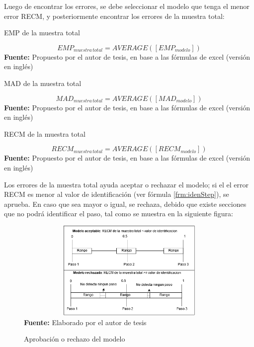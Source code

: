 Luego de encontrar los errores, se debe seleccionar el modelo que tenga el menor error \acrshort{RECM}, y posteriormente encontrar los errores de la muestra total:
 \begin{formula}[H]
	\centering
	\caption{EMP de la muestra total}
	\label{frm:EmpAll}
	\begin{equation}
EMP_{muestra\, total}=AVERAGE([EMP_{modelo}])
	\end{equation}
	\textbf{Fuente:} Propuesto por el autor de tesis, en base a las f\'ormulas de excel (versi\'on en ingl\'es)
\end{formula}  
 \begin{formula}[H]
	\centering
	\caption{MAD de la muestra total}
	\label{frm:MadAll}
	\begin{equation}
MAD_{muestra\, total}=AVERAGE([MAD_{modelo}])
	\end{equation}
	\textbf{Fuente:} Propuesto por el autor de tesis, en base a las f\'ormulas de excel (versi\'on en ingl\'es)
\end{formula}  
	 \begin{formula}[H]
	\centering
	\caption{RECM de la muestra total}
	\label{frm:RecmAll}
	\begin{equation}
RECM_{muestra\, total}=AVERAGE([RECM_{modelo}])
	\end{equation}
	\textbf{Fuente:} Propuesto por el autor de tesis, en base a las f\'ormulas de excel (versi\'on en ingl\'es)
\end{formula} 
Los errores de la muestra total ayuda aceptar o rechazar el modelo; si el el error \acrshort{RECM} es menor al valor de identificaci\'on (ver f\'ormula \ref{frm:idenStep}), se aprueba. En caso que sea mayor o igual, se rechaza, debido que existe secciones que no podr\'a identificar el paso, tal como se muestra en la siguiente figura:
\begin{figure}[H]
	\caption{Aprobaci\'on o rechazo del modelo}
	\label{fig:AproveOrDennie}
	\centering
	\includegraphics[width=430px,height=180px]{graphics/aceptacionModelo.png} \\
	\textbf{Fuente:} Elaborado por el autor de tesis
\end{figure}

